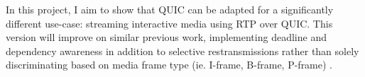 \documentclass{mprop}
\begin{document}
In this project, I aim to show that QUIC can be adapted for a significantly different use-case: 
streaming interactive media using RTP over QUIC. This version will improve on similar previous 
work, implementing deadline and dependency awareness in addition to selective restransmissions 
rather than solely discriminating based on media frame type (ie. I-frame, B-frame, P-frame) \cite
{Palmer2018}.





\end{document}
